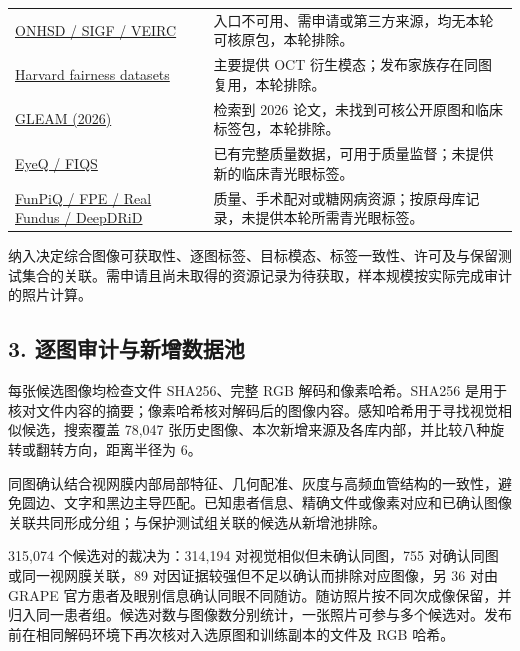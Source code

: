 \documentclass[
  10pt,
]{article}
\begin{document}
\begin{longtable}[]{@{}
  >{\raggedright\arraybackslash}p{}
  >{\raggedright\arraybackslash}p{}@{}}
\href{https://github.com/XiaofeiWang2018/DeepGF}{ONHSD / SIGF / VEIRC} &
入口不可用、需申请或第三方来源，均无本轮可核原包，本轮排除。 \\
\href{https://github.com/Harvard-Ophthalmology-AI-Lab/Harvard-GDP}{Harvard
fairness datasets} & 主要提供 OCT
衍生模态；发布家族存在同图复用，本轮排除。 \\
\href{https://doi.org/10.1109/TMI.2026.3692814}{GLEAM (2026)} & 检索到
2026 论文，未找到可核公开原图和临床标签包，本轮排除。 \\
\href{https://github.com/HzFu/EyeQ}{EyeQ / FIQS} &
已有完整质量数据，可用于质量监督；未提供新的临床青光眼标签。 \\
\href{https://zenodo.org/records/21838047}{FunPiQ / FPE / Real Fundus /
DeepDRiD} &
质量、手术配对或糖网病资源；按原母库记录，未提供本轮所需青光眼标签。 \\
\end{longtable}

纳入决定综合图像可获取性、逐图标签、目标模态、标签一致性、许可及与保留测试集合的关联。需申请且尚未取得的资源记录为待获取，样本规模按实际完成审计的照片计算。

\subsection{3.
逐图审计与新增数据池}\label{ux9010ux56feux5ba1ux8ba1ux4e0eux65b0ux589eux6570ux636eux6c60}

每张候选图像均检查文件 SHA256、完整 RGB 解码和像素哈希。SHA256
是用于核对文件内容的摘要；像素哈希核对解码后的图像内容。感知哈希用于寻找视觉相似候选，搜索覆盖
78,047
张历史图像、本次新增来源及各库内部，并比较八种旋转或翻转方向，距离半径为
6。

同图确认结合视网膜内部局部特征、几何配准、灰度与高频血管结构的一致性，避免圆边、文字和黑边主导匹配。已知患者信息、精确文件或像素对应和已确认图像关联共同形成分组；与保护测试组关联的候选从新增池排除。

315,074 个候选对的裁决为：314,194 对视觉相似但未确认同图，755
对确认同图或同一视网膜关联，89
对因证据较强但不足以确认而排除对应图像，另 36 对由 GRAPE
官方患者及眼别信息确认同眼不同随访。随访照片按不同次成像保留，并归入同一患者组。候选对数与图像数分别统计，一张照片可参与多个候选对。发布前在相同解码环境下再次核对入选原图和训练副本的文件及
RGB 哈希。
\end{document}
